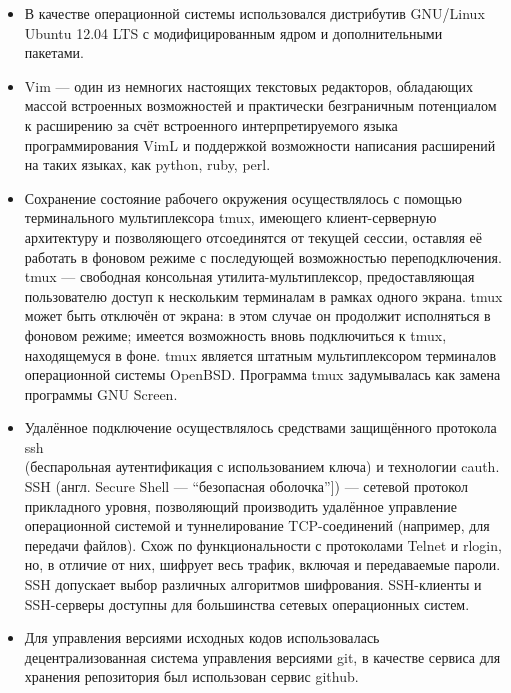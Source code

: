 \begin{itemize}

\item В качестве операционной системы использовался дистрибутив GNU/Linux
  Ubuntu 12.04 LTS с модифицированным ядром и дополнительными пакетами.

\item Vim --- один из немногих настоящих текстовых редакторов,
  обладающих массой встроенных возможностей и практически безграничным
  потенциалом к расширению за счёт встроенного интерпретируемого языка
  программирования VimL и поддержкой возможности написания расширений на
  таких языках, как python, ruby, perl.

\item Сохранение состояние рабочего окружения осуществлялось с помощью
  терминального мультиплексора tmux, имеющего клиент-серверную архитектуру и
  позволяющего отсоединятся от текущей сессии, оставляя её работать в фоновом
  режиме с последующей возможностью переподключения.
  tmux --- свободная консольная утилита-мультиплексор,
  предоставляющая пользователю доступ к нескольким терминалам в рамках
  одного экрана. tmux может быть отключён от экрана: в этом случае он
  продолжит исполняться в фоновом режиме; имеется возможность вновь
  подключиться к tmux, находящемуся в фоне. tmux является штатным
  мультиплексором терминалов операционной системы OpenBSD.
  Программа tmux задумывалась как замена программы GNU Screen.

\item Удалённое подключение осуществлялось средствами защищённого протокола
ssh\\
(беспарольная аутентификация с использованием ключа) и технологии cauth.
SSH (англ. Secure Shell --- ``безопасная оболочка'']) --- сетевой протокол
прикладного уровня, позволяющий производить удалённое управление операционной
системой и туннелирование TCP-соединений (например, для передачи файлов).
Схож по функциональности с протоколами Telnet и rlogin, но, в отличие от них,
шифрует весь трафик, включая и передаваемые пароли. SSH допускает выбор
различных алгоритмов шифрования. SSH-клиенты и SSH-серверы доступны для
большинства сетевых операционных систем.

\item Для управления версиями исходных кодов использовалась децентрализованная
  система управления версиями git, в качестве сервиса для хранения репозитория
  был использован сервис github.

\end{itemize}

